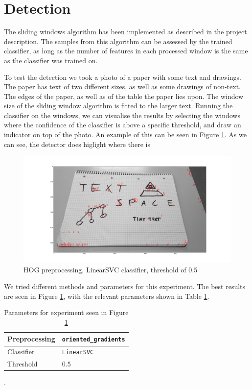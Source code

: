 \section{Detection}
The sliding windows algorithm has been implemented as described in the project
description.
The samples from this algorithm can be assessed by the trained classifier,
as long as the number of features in each processed window is the same as the classifier was trained on.

To test the detection we took a photo of a paper with some text and drawings.
The paper has text of two different sizes, as well as some drawings of non-text.
The edges of the paper, as well as of the table the paper lies upon.
The window size of the sliding window algorithm is fitted to the larger text.
Running the classifier on the windows, we can visualise the results by selecting the windows where the confidence of the classifier is above a specific threshold, and draw an indicator on top of the photo.
An example of this can be seen in Figure \ref{fig:illuminati}.
As we can see, the detector does higlight where there is 

\begin{figure}
    \centering
    \includegraphics[width=\linewidth]{img/illuminati}
    \caption{HOG preprocessing, LinearSVC classifier, threshold of 0.5}
    \label{fig:illuminati}
\end{figure}

We tried different methods and parameters for this experiment.
The best results are seen in Figure \ref{fig:illuminati},
with the relevant parameters shown in Table \ref{tbl:illuminati}.

\begin{table}
    \centering
    \begin{tabular}{l|l}
        Preprocessing   &   \texttt{oriented\_gradients}    \\\hline
        Classifier      &   \texttt{LinearSVC}              \\\hline
        Threshold       &   $0.5$
    \end{tabular}
    \caption{Parameters for experiment seen in Figure \ref{fig:illuminati}}.
    \label{tbl:illuminati}
\end{table}

